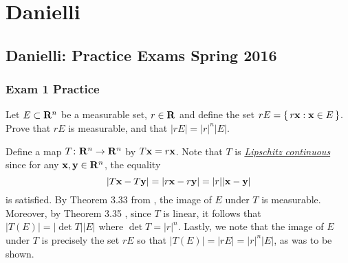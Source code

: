 \section{Danielli}
\subsection{Danielli: Practice Exams Spring 2016}
\setcounter{exercise}{0}
\setcounter{equation}{0}

\subsubsection{Exam 1 Practice}
\begin{problem}
  Let $E\subset\mathbf{R}^n$ be a measurable set, $r\in\mathbf{R}$ and define the set
  $rE=\left\{\,r\mathbf{x}:\mathbf{x}\in E\,\right\}$. Prove that $rE$ is measurable,
  and that $|rE|=|r|^n|E|$.
\end{problem}
\begin{solution}
  Define a map $T\colon\mathbf{R}^n\to\mathbf{R}^n$ by $T\mathbf{x}= r\mathbf{x}$. Note that $T$ is
  \href{https://en.wikipedia.org/wiki/Lipschitz_continuity}{\emph{Lipschitz
      continuous}} since for any $\mathbf{x},\mathbf{y}\in\mathbf{R}^n$, the equality
  \begin{equation}
    \label{eq:prep:1:1}
    |T\mathbf{x}-T\mathbf{y}|=|r\mathbf{x}-r\mathbf{y}|=|r||\mathbf{x}-\mathbf{y}|
  \end{equation}
  is satisfied. By Theorem 3.33 from \cite[Ch.\@ 3,
  p.\@55]{wheeden-zygmund}, the image of $E$ under $T$ is
  measurable. Moreover, by Theorem 3.35 \cite[Ch.\@ 3, p.\@
  56]{wheeden-zygmund}, since $T$ is linear, it follows that
  $|T(E)|=|{\det T}||E|$ where $\det T=|r|^n$. Lastly, we note that the
  image of $E$ under $T$ is precisely the set $rE$ so that
  $|T(E)|=|rE|=|r|^n|E|$, as was to be shown.
\end{solution}

